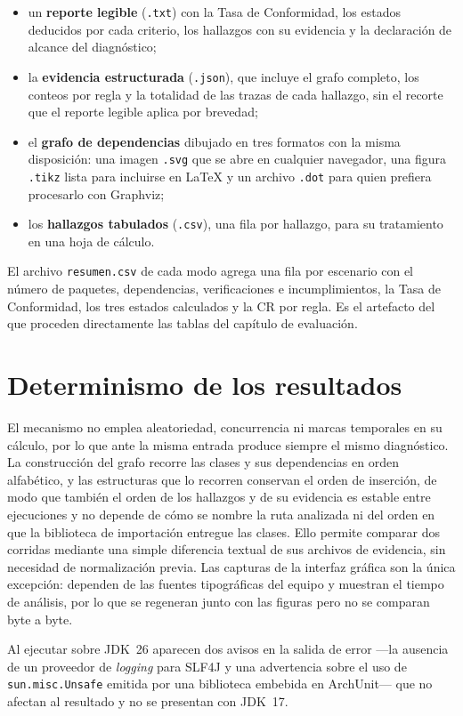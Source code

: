 \begin{itemize}
    \item un \textbf{reporte legible} (\texttt{.txt}) con la Tasa de Conformidad, los estados deducidos por cada criterio, los hallazgos con su evidencia y la declaración de alcance del diagnóstico;
    \item la \textbf{evidencia estructurada} (\texttt{.json}), que incluye el grafo completo, los conteos por regla y la totalidad de las trazas de cada hallazgo, sin el recorte que el reporte legible aplica por brevedad;
    \item el \textbf{grafo de dependencias} dibujado en tres formatos con la misma disposición: una imagen \texttt{.svg} que se abre en cualquier navegador, una figura \texttt{.tikz} lista para incluirse en \LaTeX{} y un archivo \texttt{.dot} para quien prefiera procesarlo con Graphviz;
    \item los \textbf{hallazgos tabulados} (\texttt{.csv}), una fila por hallazgo, para su tratamiento en una hoja de cálculo.
\end{itemize}

El archivo \texttt{resumen.csv} de cada modo agrega una fila por escenario con el número de paquetes, dependencias, verificaciones e incumplimientos, la Tasa de Conformidad, los tres estados calculados y la CR por regla. Es el artefacto del que proceden directamente las tablas del capítulo de evaluación.

\section{Determinismo de los resultados}
El mecanismo no emplea aleatoriedad, concurrencia ni marcas temporales en su cálculo, por lo que ante la misma entrada produce siempre el mismo diagnóstico. La construcción del grafo recorre las clases y sus dependencias en orden alfabético, y las estructuras que lo recorren conservan el orden de inserción, de modo que también el orden de los hallazgos y de su evidencia es estable entre ejecuciones y no depende de cómo se nombre la ruta analizada ni del orden en que la biblioteca de importación entregue las clases. Ello permite comparar dos corridas mediante una simple diferencia textual de sus archivos de evidencia, sin necesidad de normalización previa. Las capturas de la interfaz gráfica son la única excepción: dependen de las fuentes tipográficas del equipo y muestran el tiempo de análisis, por lo que se regeneran junto con las figuras pero no se comparan byte a byte.

Al ejecutar sobre JDK~26 aparecen dos avisos en la salida de error —la ausencia de un proveedor de \textit{logging} para SLF4J y una advertencia sobre el uso de \texttt{sun.misc.Unsafe} emitida por una biblioteca embebida en ArchUnit— que no afectan al resultado y no se presentan con JDK~17.
